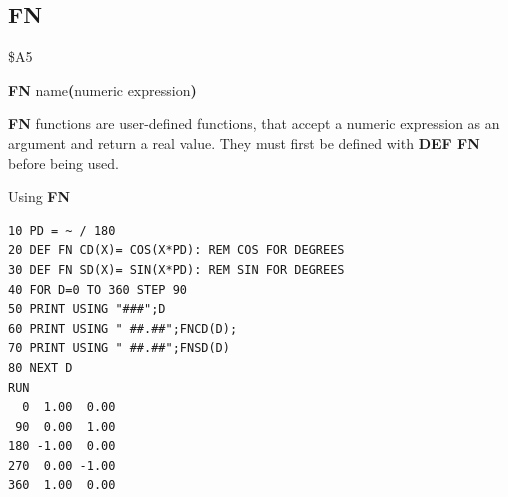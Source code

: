 \subsection{FN}
\begin{description}[leftmargin=2cm,style=nextline]
\item [Token:] \$A5
\item [Format:] {\bf FN} name{\bf(}numeric expression{\bf)}
\item [Usage:] {\bf FN} functions are user-defined
               functions, that accept a numeric expression as an
               argument and return a real value.
               They must first be defined with {\bf DEF FN} before
               being used.

\item [Example:] Using {\bf FN}
\begin{tcolorbox}[colback=black,coltext=white]
\verbatimfont{\codefont}
\begin{verbatim}
10 PD = ~ / 180
20 DEF FN CD(X)= COS(X*PD): REM COS FOR DEGREES
30 DEF FN SD(X)= SIN(X*PD): REM SIN FOR DEGREES
40 FOR D=0 TO 360 STEP 90
50 PRINT USING "###";D
60 PRINT USING " ##.##";FNCD(D);
70 PRINT USING " ##.##";FNSD(D)
80 NEXT D
RUN
  0  1.00  0.00
 90  0.00  1.00
180 -1.00  0.00
270  0.00 -1.00
360  1.00  0.00
\end{verbatim}
\end{tcolorbox}
\end{description}


\newpage
